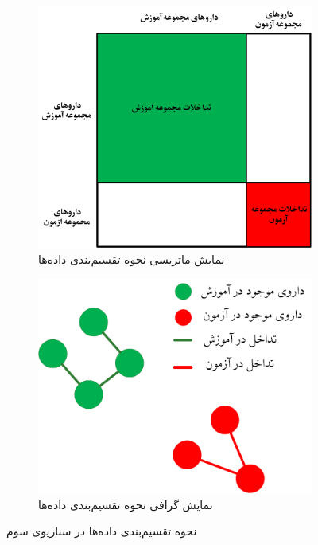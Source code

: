 \begin{figure}[!t]
	\centering
	\begin{subfigure}[b]{0.42\textwidth} %
		\centering
		\includegraphics[width=\textwidth]{images/senario-3-matrix.png}
		\caption{نمایش ماتریسی نحوه تقسیم‌بندی داده‌ها}
		\label{fig:senario-3-matrix}
	\end{subfigure}
	\hspace{0.04\textwidth} %
	\begin{subfigure}[b]{0.42\textwidth} %
		\centering
		\includegraphics[width=\textwidth]{images/senario-3-graph.png}
		\caption{نمایش گرافی نحوه تقسیم‌بندی داده‌ها}
		\label{fig:senario-3-graph}
	\end{subfigure}
	\caption{نحوه تقسیم‌بندی داده‌ها در سناریوی سوم}
	\label{fig:senario-3}
\end{figure}


